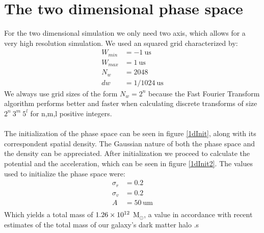\section{The two dimensional phase space}
\vspace{-5mm} \vspace{1mm}

For the two dimensional simulation we only need two axis, which allows for a very high resolution simulation. We used an squared grid characterized by:
\begin{align}
W_{min} &= -1 \ \text{us}\\
W_{max} &= 1 \ \text{us}\\
N_w &= 2048\\
dw &= 1/1024 \ \text{us}
\end{align}
We always use grid sizes of the form $N_w = 2^n$ because the Fast Fourier Transform algorithm performs better and faster when calculating discrete transforms of size $2^n \ 3^m \ 5^l$ for n,m,l positive integers.\\ \\ 
\vspace{-1mm}
The initialization of the phase space can be seen in figure \ref{1dInit}, along with its correspondent spatial density.
The Gaussian nature of both the phase space and the density can be appreciated. 
After initialization we proceed to calculate the potential and the acceleration, which can be seen in figure \ref{1dInit2}.
The values used to initialize the phase space were:
\begin{align}
\sigma_r &= 0.2\\
\sigma_v &= 0.2\\
A &= 50  \ \text{um} \\
\end{align}
Which yields a total mass of $1.26\times 10^{12}$ M$_{\odot}$, a value in accordance with recent estimates of the total mass of our galaxy's dark matter halo \cite{2013JCAP07016N}.s



